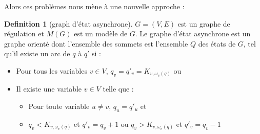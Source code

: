 \documentclass[11pt]{report}
\theoremstyle{definition}
\newtheorem{Def}{Definition}[chapter]
\begin{document}
Alors ces probl\`emes nous m\`ene \`a une nouvelle approche :
\begin{Def}[graph d'\'etat asynchrone]
$G=(V,E)$ est un graphe de r\'egulation et $M(G)$ est un mod\`ele de $G$. Le graphe d'\'etat asynchrone est un graphe orient\'e dont l'ensemble des sommets est l'ensemble $Q$ des \'etats de $G$, tel qu'il existe un arc de $q$ \`a $q'$ si :
\begin{itemize}
\item Pour tous les variables $v\in V$, $q_v=q'_v=K_{v,\omega_v(q)}$ ou
\item Il existe une variable $v\in V$ telle que :
\begin{itemize}
\item Pour toute variable $u\neq v$, $q_u=q'_u$ et
\item $q_v<K_{v,\omega_v(q)}$ et $q'_v=q_v+1$ ou $q_v>K_{v,\omega_v(q)}$ et $q'_v=q_v-1$
\end{itemize}
\end{itemize}
\end{Def} 
\end{document}
